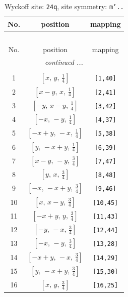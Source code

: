 \documentclass[fleqn,8pt]{jsarticle}
\begin{document}
\begin{longtable}{ccc}
\caption{Wyckoff site: {\tt 24q}, site symmetry: {\tt m'..}}
 \\
 \hline \hline
No. & position & mapping \\ \hline \endfirsthead

\multicolumn{2}{l}{\tablename\ \thetable{}} \\
 \hline \hline
No. & position & mapping \\ \hline \endhead

 \hline \hline
\multicolumn{2}{r}{\footnotesize\it continued ...} \\ \endfoot

 \hline \hline
\multicolumn{2}{r}{} \\ \endlastfoot

1 & $\left[ x,\, y,\, \frac{1}{4} \right]$ & {\tt [1,40]} \\ \hline
2 & $\left[ x - y,\, x,\, \frac{1}{4} \right]$ & {\tt [2,41]} \\ \hline
3 & $\left[ - y,\, x - y,\, \frac{1}{4} \right]$ & {\tt [3,42]} \\ \hline
4 & $\left[ - x,\, - y,\, \frac{1}{4} \right]$ & {\tt [4,37]} \\ \hline
5 & $\left[ - x + y,\, - x,\, \frac{1}{4} \right]$ & {\tt [5,38]} \\ \hline
6 & $\left[ y,\, - x + y,\, \frac{1}{4} \right]$ & {\tt [6,39]} \\ \hline
7 & $\left[ x - y,\, - y,\, \frac{3}{4} \right]$ & {\tt [7,47]} \\ \hline
8 & $\left[ y,\, x,\, \frac{3}{4} \right]$ & {\tt [8,48]} \\ \hline
9 & $\left[ - x,\, - x + y,\, \frac{3}{4} \right]$ & {\tt [9,46]} \\ \hline
10 & $\left[ x,\, x - y,\, \frac{3}{4} \right]$ & {\tt [10,45]} \\ \hline
11 & $\left[ - x + y,\, y,\, \frac{3}{4} \right]$ & {\tt [11,43]} \\ \hline
12 & $\left[ - y,\, - x,\, \frac{3}{4} \right]$ & {\tt [12,44]} \\ \hline
13 & $\left[ - x,\, - y,\, \frac{3}{4} \right]$ & {\tt [13,28]} \\ \hline
14 & $\left[ - x + y,\, - x,\, \frac{3}{4} \right]$ & {\tt [14,29]} \\ \hline
15 & $\left[ y,\, - x + y,\, \frac{3}{4} \right]$ & {\tt [15,30]} \\ \hline
16 & $\left[ x,\, y,\, \frac{3}{4} \right]$ & {\tt [16,25]} \\ \hline

\end{longtable}
\end{document}
